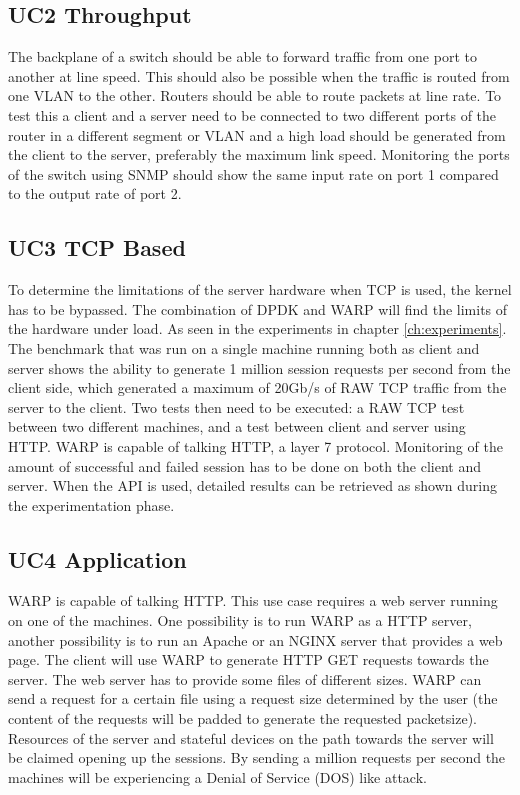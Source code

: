 \subsection{UC2 Throughput}
The backplane of a switch should be able to forward traffic from one port to another at line speed. This should also be possible when the traffic is routed from one VLAN to the other. Routers should be able to route packets at line rate. To test this a client and a server need to be connected to two different ports of the router in a different segment or VLAN and a high load should be generated from the client to the server, preferably the maximum link speed. Monitoring the ports of the switch using SNMP should show the same input rate on port 1 compared to the output rate of port 2.    

\subsection{UC3 TCP Based}
To determine the limitations of the server hardware when TCP is used, the kernel has to be bypassed. The combination of DPDK and WARP will find the limits of the hardware under load. As seen in the experiments in chapter \ref{ch:experiments}. The benchmark that was run on a single machine running both as client and server shows the ability to generate 1 million session requests per second from the client side, which generated a maximum of 20Gb/s of RAW TCP traffic from the server to the client. Two tests then need to be executed: a RAW TCP test between two different machines, and a test between client and server using HTTP. WARP is capable of talking HTTP, a layer 7 protocol. Monitoring of the amount of successful and failed session has to be done on both the client and server. When the API is used, detailed results can be retrieved as shown during the experimentation phase.   

\subsection{UC4 Application}
WARP is capable of talking HTTP. This use case requires a web server running on one of the machines. 
One possibility is to run WARP as a HTTP server, another possibility is to run an Apache or an NGINX server that provides a web page.
The client will use WARP to generate HTTP GET requests towards the server. The web server has to provide some files of different sizes. WARP can send a request for a certain file using a request size determined by the user (the content of the requests will be padded to generate the requested packetsize).  Resources of the server and stateful devices on the path towards the server will be claimed opening up the sessions. By sending a million requests per second the machines will be experiencing a Denial of Service (DOS) like attack.

